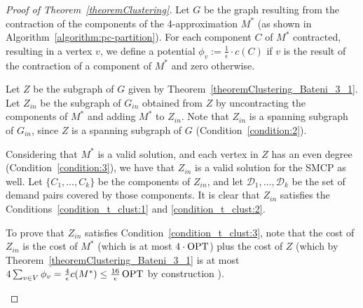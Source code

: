 \begin{proof}[Proof of Theorem~\ref{theoremClustering}]

Let \(G\) be the graph resulting from the contraction of the components of the 4-approximation \(M^\ast\) (as shown in Algorithm~\ref{algorithm:pc-partition}). For each component \(C\) of \(M^\ast\) contracted, resulting in a vertex \(v\), we define a potential \(\phi_v := \frac{1}{\epsilon} \cdot c(C)\) if \(v\) is the result of the contraction of a component of \(M^\ast\) and zero otherwise. 

Let \(Z\) be the subgraph of \(G\) given by Theorem~\ref{theoremClustering_Bateni_3_1}. Let \(Z_{in}\) be the subgraph of \(G_{in}\) obtained from \(Z\) by uncontracting the components of \(M^\ast\) and adding \(M^\ast\) to \(Z_{in}\). Note that \(Z_{in}\) is a spanning subgraph of \(G_{in}\), since \(Z\) is a spanning subgraph of \(G\) (Condition~\eqref{condition:2}).

Considering that \(M^\ast\) is a valid solution, and each vertex in \(Z\) has an even degree (Condition~\eqref{condition:3}), we have that \(Z_{in}\) is a valid solution for the SMCP as well. Let \(\{C_1, \dots, C_k\}\) be the components of \(Z_{in}\), and let \(\mathcal{D}_1, \dots, \mathcal{D}_k\) be the set of demand pairs covered by those components. It is clear that \(Z_{in}\) satisfies the Conditions~\eqref{condition_t_clust:1} and \eqref{condition_t_clust:2}.

To prove that \(Z_{in}\) satisfies Condition~\eqref{condition_t_clust:3}, note that the cost of \(Z_{in}\) is the cost of \(M^\ast\) (which is at most \(4 \cdot \operatorname{\textrm{OPT}}\)) plus the cost of \(Z\) (which by Theorem~\ref{theoremClustering_Bateni_3_1} is at most \( 4 \sum_{v \in V} \phi_v = \frac{4}{\epsilon} c(M^\ast) \leq \frac{16}{\epsilon} \operatorname{\textrm{OPT}} \) by construction ).


\begin{figure}[H]
    \centering
\end{figure}
\end{proof}

